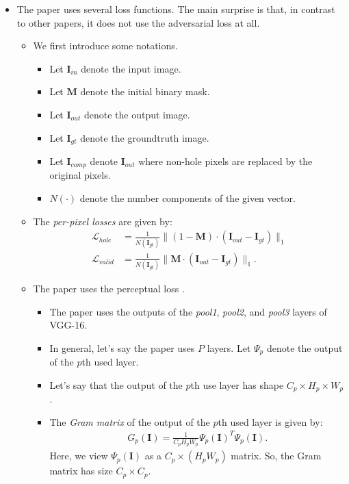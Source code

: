 \documentclass[10pt]{article}
\newcommand{\ve}[1]{\mathbf{#1}}
\begin{document}
\begin{itemize}
    \item The paper uses several loss functions. The main surprise is that, in contrast to other papers, it does not use the adversarial loss at all.

    \begin{itemize}
      \item We first introduce some notations.
      \begin{itemize}
        \item Let $\ve{I}_{in}$ denote the input image.
        \item Let $\ve{M}$ denote the initial binary mask.
        \item Let $\ve{I}_{out}$ denote the output image.
        \item Let $\ve{I}_{gt}$ denote the groundtruth image.
        \item Let $\ve{I}_{comp}$ denote $\ve{I}_{out}$ where non-hole pixels are replaced by the original pixels.
        \item $N(\cdot)$ denote the number components of the given vector.        
      \end{itemize}

      \item The \emph{per-pixel losses} are given by:
      \begin{align*}
        \mathcal{L}_{hole} 
        &= \frac{1}{N(\ve{I}_{gt})} \| (1-\ve{M}) \cdot (\ve{I}_{out} - \ve{I}_{gt}) \|_1 \\
        \mathcal{L}_{valid}
        &= \frac{1}{N(\ve{I}_{gt})} \| \ve{M} \cdot (\ve{I}_{out} - \ve{I}_{gt}) \|_1.
      \end{align*}      

      \item The paper uses the perceptual loss \cite{Johnson:2016}.
      \begin{itemize}
        \item The paper uses the outputs of the \emph{pool1}, \emph{pool2}, and \emph{pool3} layers of VGG-16.
        \item In general, let's say the paper uses $P$ layers. Let $\Psi_{p}$ denote the output of the $p$th used layer.
        \item Let's say that the output of the $p$th use layer has shape $C_p \times H_p \times W_p$.
        \item The \emph{Gram matrix} of the output of the $p$th used layer is given by:
        \begin{align*}
          G_p(\ve{I}) = \frac{1}{C_p H_p W_p} \Psi_p(\ve{I})^T \Psi_p(\ve{I}).
        \end{align*}
        Here, we view $\Psi_p(\ve{I})$ as a $C_p \times (H_pW_p)$ matrix. So, the Gram matrix has size $C_p \times C_p$.
      \end{itemize}


\end{itemize}
\end{itemize}
\end{document}
